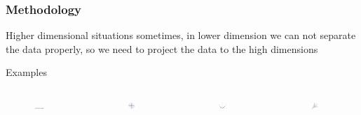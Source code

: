 \documentclass[xcolor={x11names,svgnames,dvipsnames}]{beamer}
\begin{document}
\begin{frame}
\frametitle{Methodology}
\begin{block}{Higher dimensional situations}
sometimes, in lower dimension we can not separate the data properly, so we need to project the data to the high dimensions\\
\end{block}
\begin{block}{Examples}
\begin{columns}
\column{2.3in}
\begin{figure}
     \includegraphics[width=0.5\textwidth, height=0.1\textheight]{1d.png}
\end{figure}
\begin{figure}
     \includegraphics[width=0.5\textwidth, height=0.3\textheight]{2d.png}
\end{figure}

\column{2.3in}
\begin{figure}
     \includegraphics[width=0.5\textwidth, height=0.2\textheight]{1d_2.png}
\end{figure}
\begin{figure}
     \includegraphics[width=0.5\textwidth, height=0.2\textheight]{2d_2.png}
\end{figure}
\end{columns}
\end{block}
\end{frame}
\end{document}
